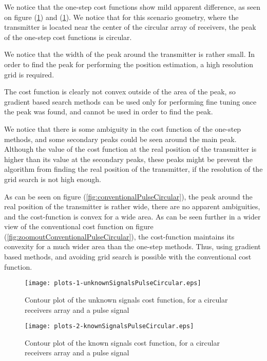 We notice that the one-step cost functions show mild apparent difference, as seen on figure (\ref{fig:unknownSignalsPulseCircular}) and (\ref{fig:unknownSignalsPulseCircular}). 
We notice that for this scenario geometry, where the transmitter is located near the center of the circular array of receivers, the peak of the one-step cost functions is circular. 

We notice that the width of the peak around the transmitter is rather small. In order to find the peak for performing the position estimation, a high resolution grid is required. 

The cost function is clearly not convex outside of the area of the peak, so gradient based search methods can be used only for performing fine tuning once the peak was found, and cannot be used in order to find the peak.

We notice that there is some ambiguity in the cost function of the one-step methods, and some secondary peaks could be seen around the main peak. Although the value of the cost function at the real position of the transmitter is higher than its value at the secondary peaks, these peaks might be prevent the algorithm from finding the real position of the transmitter, if the resolution of the grid search is not high enough.

As can be seen on figure (\ref{fig:conventionalPulseCircular}), the peak around the real position of the transmitter is rather wide, there are no apparent ambiguities, and the cost-function is convex for a wide area. 
As can be seen further in a wider view of the conventional cost function on figure (\ref{fig:zoomoutConventionalPulseCircular}), the cost-function maintains its convexity for a much wider area than the one-step methods.
Thus, using gradient based methods, and avoiding grid search is possible with the conventional cost function.

\begin{figure}
\begin{center}
\texttt{[image: plots-1-unknownSignalsPulseCircular.eps]} 
\end{center}
\caption{Contour plot of the unknown signals cost function, for a circular receivers array and a pulse signal}
\label{fig:unknownSignalsPulseCircular}
\end{figure}

\begin{figure}
\begin{center}
\texttt{[image: plots-2-knownSignalsPulseCircular.eps]} 
\end{center}
\caption{Contour plot of the known signals cost function, for a circular receivers array and a pulse signal}
\label{fig:knownSignalsPulseCircular}
\end{figure}

